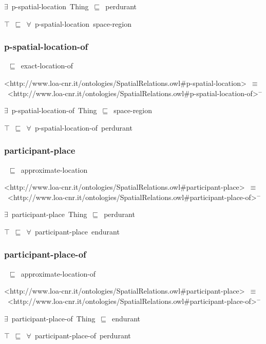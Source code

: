 \documentclass{article}
\begin{document}
\ensuremath{\exists}~p-spatial-location~Thing~\ensuremath{\sqsubseteq}~perdurant

\ensuremath{\top}~\ensuremath{\sqsubseteq}~\ensuremath{\forall}~p-spatial-location~space-region

\subsubsection*{p-spatial-location-of}

~\ensuremath{\sqsubseteq}~exact-location-of

<http://www.loa-cnr.it/ontologies/SpatialRelations.owl#p-spatial-location>~\ensuremath{\equiv}~<http://www.loa-cnr.it/ontologies/SpatialRelations.owl#p-spatial-location-of>\ensuremath{^-}

\ensuremath{\exists}~p-spatial-location-of~Thing~\ensuremath{\sqsubseteq}~space-region

\ensuremath{\top}~\ensuremath{\sqsubseteq}~\ensuremath{\forall}~p-spatial-location-of~perdurant

\subsubsection*{participant-place}

~\ensuremath{\sqsubseteq}~approximate-location

<http://www.loa-cnr.it/ontologies/SpatialRelations.owl#participant-place>~\ensuremath{\equiv}~<http://www.loa-cnr.it/ontologies/SpatialRelations.owl#participant-place-of>\ensuremath{^-}

\ensuremath{\exists}~participant-place~Thing~\ensuremath{\sqsubseteq}~perdurant

\ensuremath{\top}~\ensuremath{\sqsubseteq}~\ensuremath{\forall}~participant-place~endurant

\subsubsection*{participant-place-of}

~\ensuremath{\sqsubseteq}~approximate-location-of

<http://www.loa-cnr.it/ontologies/SpatialRelations.owl#participant-place>~\ensuremath{\equiv}~<http://www.loa-cnr.it/ontologies/SpatialRelations.owl#participant-place-of>\ensuremath{^-}

\ensuremath{\exists}~participant-place-of~Thing~\ensuremath{\sqsubseteq}~endurant

\ensuremath{\top}~\ensuremath{\sqsubseteq}~\ensuremath{\forall}~participant-place-of~perdurant
\end{document}
